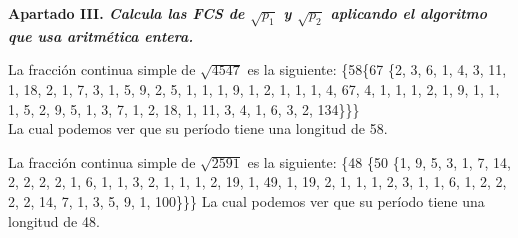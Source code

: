 \documentclass[fleqn]{article}
\begin{document}
    \newpage
    \textbf{Apartado III. \textit{Calcula las FCS de $\sqrt{p_1}$ y $\sqrt{p_2}$ aplicando el algoritmo que usa aritmética entera.}}

    La fracción continua simple de $\sqrt{4547}$ es la siguiente:
    \{58\{67 \{2, 3, 6, 1, 4, 3, 11, 1, 18, 2, 1, 7, 3, 1, 5, 9, 2, 5, 1, 1, 1, 9, 1, 2, 1, 1, 1, 4, 67, 4, 1, 1, 1, 2, 1, 9, 1, 1, 1, 5, 
    2, 9, 5, 1, 3, 7, 1, 2, 18, 1, 11, 3, 4, 1, 6, 3, 2, 134\}\}\} \\
    La cual podemos ver que su período tiene una longitud de 58.

    La fracción continua simple de $\sqrt{2591}$ es la siguiente:
    \{48 \{50 \{1, 9, 5, 3, 1, 7, 14, 2, 2, 2, 2, 1, 6, 1, 1, 3, 2, 1, 1, 1, 2, 19, 1, 49, 1, 19, 2, 1, 1, 1, 2, 3, 1, 1, 6, 1, 2, 2, 2, 
    2, 14, 7, 1, 3, 5, 9, 1, 100\}\}\}
    La cual podemos ver que su período tiene una longitud de 48.
\end{document}
